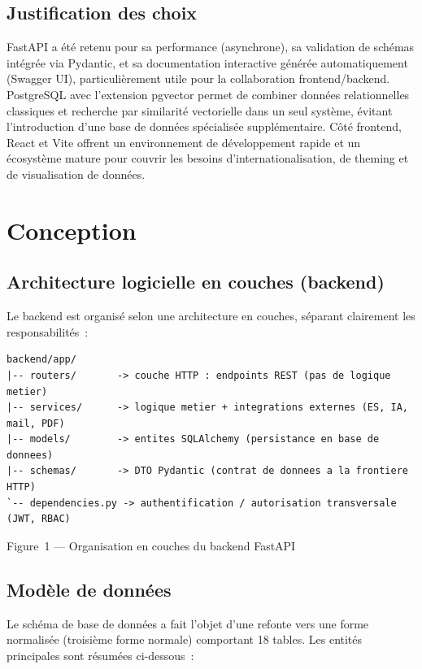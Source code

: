 \documentclass[11pt,a4paper]{report}
\begin{document}
\section{Justification des choix}

FastAPI a été retenu pour sa performance (asynchrone), sa validation de schémas intégrée via Pydantic, et sa
documentation interactive générée automatiquement (Swagger UI), particulièrement utile pour la collaboration
frontend/backend. PostgreSQL avec l'extension pgvector permet de combiner données relationnelles classiques
et recherche par similarité vectorielle dans un seul système, évitant l'introduction d'une base de données
spécialisée supplémentaire. Côté frontend, React et Vite offrent un environnement de développement rapide et
un écosystème mature pour couvrir les besoins d'internationalisation, de theming et de visualisation de
données.

\chapter{Conception}

\section{Architecture logicielle en couches (backend)}

Le backend est organisé selon une architecture en couches, séparant clairement les responsabilités~:

\begin{lstlisting}
backend/app/
|-- routers/       -> couche HTTP : endpoints REST (pas de logique metier)
|-- services/      -> logique metier + integrations externes (ES, IA, mail, PDF)
|-- models/        -> entites SQLAlchemy (persistance en base de donnees)
|-- schemas/       -> DTO Pydantic (contrat de donnees a la frontiere HTTP)
`-- dependencies.py -> authentification / autorisation transversale (JWT, RBAC)
\end{lstlisting}
\begin{center}\small\color{grey} Figure~1 --- Organisation en couches du backend FastAPI \end{center}

\section{Modèle de données}

Le schéma de base de données a fait l'objet d'une refonte vers une forme normalisée (troisième forme
normale) comportant 18 tables. Les entités principales sont résumées ci-dessous~:
\end{document}
